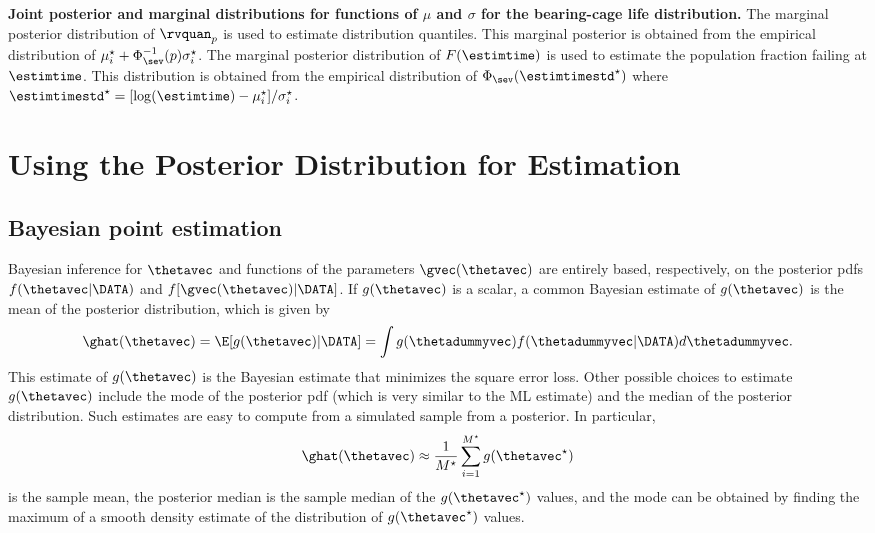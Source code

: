 \begin{example}
{\bf Joint posterior and marginal distributions for functions of
$\mu$ and $\sigma$ for the bearing-cage life distribution.}  The
marginal posterior distribution of $\rvquan_{p}$ is used to estimate
distribution quantiles. This marginal posterior is obtained from the
empirical distribution of $\mu_{i}^{\star}+
\Phi^{-1}_{\sev}(p) \sigma_{i}^{\star}$.
The marginal posterior distribution of $F(\estimtime)$ is used to
estimate the population fraction failing at $\estimtime$.  This
distribution is obtained from the empirical distribution of
$\Phi_{\sev} (\estimtimestd^{\star})$ where $\estimtimestd^{\star} =
[\log(\estimtime)-\mu_{i}^{\star}]/ \sigma_{i}^{\star}$.
\end{example}

\section{Using the Posterior Distribution for Estimation}
\label{section:bayes.estimation}
\subsection{Bayesian point estimation}

Bayesian inference for $\thetavec$
and functions of the parameters $\gvec(\thetavec)$ 
are entirely based, respectively, on the
posterior pdfs $f(\thetavec | \DATA)$
and $f[\gvec(\thetavec)| \DATA]$.
If $g(\thetavec)$ is a
scalar, a common Bayesian estimate of
$g(\thetavec)$ is
the mean of the posterior distribution, which is given by
\begin{displaymath}
\ghat(\thetavec)=\E[g(\thetavec)| \DATA]=
\int g(\thetadummyvec) f( \thetadummyvec| \DATA) d\thetadummyvec.
\end{displaymath}
This estimate of $g(\thetavec)$ is the Bayesian estimate that
minimizes the square error loss.  Other possible choices to estimate
$g(\thetavec)$ include the mode of the posterior pdf (which is very
similar to the ML estimate) and the median of the posterior
distribution.  Such estimates are easy to compute from a simulated
sample from a posterior. In particular,
\begin{displaymath}
\ghat(\thetavec) \approx  \frac{1}{M^{\star}} \sum_{i=1}^{M^{\star}} g(\thetavec^{\star})
\end{displaymath}
is the sample mean, the posterior median is the sample median of the
$g(\thetavec^{\star})$ values, and the mode can be obtained by finding the
maximum of a smooth density estimate of the distribution of
$g(\thetavec^{\star})$ values.

